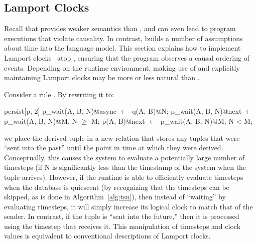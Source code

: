 
\subsection{Lamport Clocks}

Recall that  provides weaker semantics than
, and can even lead to program executions that violate
causality.  In contrast,  builds a number of
assumptions about time into the language model.  This section explains
how to implement Lamport clocks~\cite{timeclocks} atop
, ensuring that the program observes a causal ordering
of events.  Depending on the runtime environment, making use of
 and explicitly maintaining Lamport clocks may be more
or less natural than .  

Consider a rule .  By
rewriting it to:

\begin{Dedalus}
persist[p, 2]
p\_wait(A, B, N)@async \(\leftarrow\) q(A, B)@N;
p\_wait(A, B, N)@next \(\leftarrow\) p\_wait(A, B, N)@M, N \(\ge\) M;
p(A, B)@next \(\leftarrow\) p\_wait(A, B, N)@M, N < M;
\end{Dedalus}

we place the derived tuple in a new relation  that
stores any tuples that were ``sent into the past'' until the point in
time at which they were derived.  Conceptually, this causes the system
to evaluate a potentially large number of timesteps (if N is
significantly less than the timestamp of the system when the tuple
arrives).  However, if the runtime is able to efficiently evaluate
timesteps when the database is quiescent (by recognizing that the
timesteps can be skipped, as is done in Algorithm~\ref{alg:tsn}), then instead of ``waiting'' by evaluating
timesteps, it will simply increase its logical clock to match that of
the sender.  In contrast, if the tuple is ``sent into the future,''
then it is processed using the timestep that receives it.  This
manipulation of timesteps and clock values is equivalent to
conventional descriptions of Lamport clocks.


